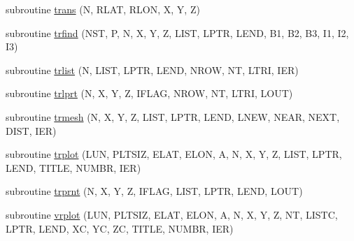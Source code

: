 \begin{DoxyCompactItemize}
\item 
subroutine \hyperlink{stripack_8f_af703d58fea56548ee1c25d58fae2a2aa}{trans} (N, R\+L\+A\+T, R\+L\+O\+N, X, Y, Z)
\item 
subroutine \hyperlink{stripack_8f_a281e7e9b41cb9fd4b67ac1f9d60011c3}{trfind} (N\+S\+T, P, N, X, Y, Z, L\+I\+S\+T, L\+P\+T\+R, L\+E\+N\+D, B1, B2, B3, I1, I2, I3)
\item 
subroutine \hyperlink{stripack_8f_aa5091ed46cf65046d911584d8cd35d9a}{trlist} (N, L\+I\+S\+T, L\+P\+T\+R, L\+E\+N\+D, N\+R\+O\+W, N\+T, L\+T\+R\+I, I\+E\+R)
\item 
subroutine \hyperlink{stripack_8f_ab1812571c60de8b176bc112855cc277b}{trlprt} (N, X, Y, Z, I\+F\+L\+A\+G, N\+R\+O\+W, N\+T, L\+T\+R\+I, L\+O\+U\+T)
\item 
subroutine \hyperlink{stripack_8f_a72d47c06df7e0755a2cf02a5fda2d2d8}{trmesh} (N, X, Y, Z, L\+I\+S\+T, L\+P\+T\+R, L\+E\+N\+D, L\+N\+E\+W, N\+E\+A\+R, N\+E\+X\+T, D\+I\+S\+T, I\+E\+R)
\item 
subroutine \hyperlink{stripack_8f_a2937264eab62a7e51143becd01640a3a}{trplot} (L\+U\+N, P\+L\+T\+S\+I\+Z, E\+L\+A\+T, E\+L\+O\+N, A, N, X, Y, Z, L\+I\+S\+T, L\+P\+T\+R, L\+E\+N\+D, T\+I\+T\+L\+E, N\+U\+M\+B\+R, I\+E\+R)
\item 
subroutine \hyperlink{stripack_8f_a06b275a9299a6f3a0b568a9a4715d6fc}{trprnt} (N, X, Y, Z, I\+F\+L\+A\+G, L\+I\+S\+T, L\+P\+T\+R, L\+E\+N\+D, L\+O\+U\+T)
\item 
subroutine \hyperlink{stripack_8f_a8977bc12b0f0593f5fedec52e3434daf}{vrplot} (L\+U\+N, P\+L\+T\+S\+I\+Z, E\+L\+A\+T, E\+L\+O\+N, A, N, X, Y, Z, N\+T, L\+I\+S\+T\+C, L\+P\+T\+R, L\+E\+N\+D, X\+C, Y\+C, Z\+C, T\+I\+T\+L\+E, N\+U\+M\+B\+R, I\+E\+R)
\end{DoxyCompactItemize}


